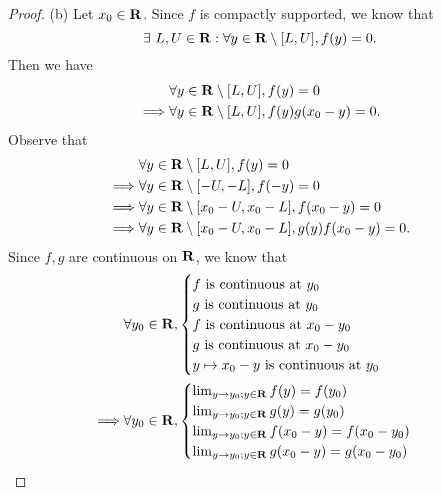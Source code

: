\begin{proof}{(b)}
  Let \(x_0 \in \mathbf{R}\).
  Since \(f\) is compactly supported, we know that
  \[
    \exists\ L, U \in \mathbf{R} : \forall y \in \mathbf{R} \setminus [L, U], f(y) = 0.
  \]
  Then we have
  \begin{align*}
             & \forall y \in \mathbf{R} \setminus [L, U], f(y) = 0             \\
    \implies & \forall y \in \mathbf{R} \setminus [L, U], f(y) g(x_0 - y) = 0.
  \end{align*}
  Observe that
  \begin{align*}
             & \forall y \in \mathbf{R} \setminus [L, U], f(y) = 0                         \\
    \implies & \forall y \in \mathbf{R} \setminus [-U, -L], f(-y) = 0                      \\
    \implies & \forall y \in \mathbf{R} \setminus [x_0 - U, x_0 - L], f(x_0 - y) = 0       \\
    \implies & \forall y \in \mathbf{R} \setminus [x_0 - U, x_0 - L], g(y) f(x_0 - y) = 0.
  \end{align*}
  Since \(f, g\) are continuous on \(\mathbf{R}\), we know that
  \begin{align*}
             & \forall y_0 \in \mathbf{R}, \begin{cases}
                                     f \text{ is continuous at } y_0       \\
                                     g \text{ is continuous at } y_0       \\
                                     f \text{ is continuous at } x_0 - y_0 \\
                                     g \text{ is continuous at } x_0 - y_0 \\
                                     y \mapsto x_0 - y \text{ is continuous at } y_0
                                   \end{cases}                    \\
    \implies & \forall y_0 \in \mathbf{R}, \begin{cases}
                                     \lim_{y \to y_0 ; y \in \mathbf{R}} f(y) = f(y_0)             \\
                                     \lim_{y \to y_0 ; y \in \mathbf{R}} g(y) = g(y_0)             \\
                                     \lim_{y \to y_0 ; y \in \mathbf{R}} f(x_0 - y) = f(x_0 - y_0) \\
                                     \lim_{y \to y_0 ; y \in \mathbf{R}} g(x_0 - y) = g(x_0 - y_0)

\end{cases}
\end{align*}
\end{proof}
